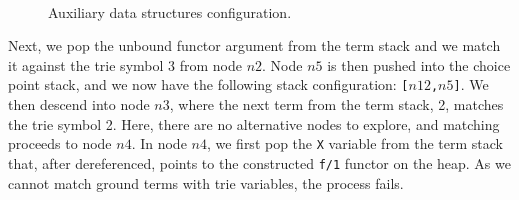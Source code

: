 \begin{figure}
   \centering
   \qquad
    \\

   \caption{Auxiliary data structures configuration.}
   \label{fig:data_structs}
\end{figure}

Next, we pop the unbound functor argument from the term stack and we
match it against the trie symbol 3 from node $n2$. Node $n5$ is then
pushed into the choice point stack, and we now have the following
stack configuration: \texttt{[$n12$,$n5$]}. We then descend into node $n3$, where
the next term from the term stack, 2, matches the trie symbol 2. Here,
there are no alternative nodes to explore, and matching proceeds to
node $n4$. In node $n4$, we first pop the \texttt{X} variable from the term
stack that, after dereferenced, points to the constructed \texttt{f/1}
functor on the heap. As we cannot match ground terms with trie
variables, the process fails.

